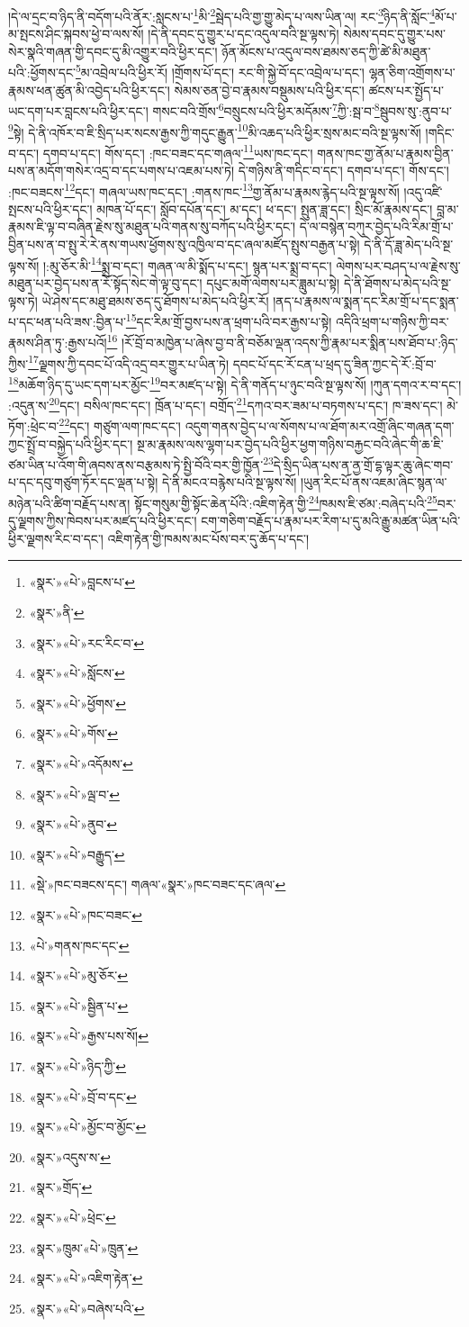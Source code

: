 །དེ་ལ་དྲང་བ་ཉིད་ནི་བདོག་པའི་ནོར་:སླངས་པ་\footnote{«སྣར་»«པེ་»བླངས་པ་}མི་\footnote{«སྣར་»ནི་}སྦེད་པའི་གྱ་གྱུ་མེད་པ་ལས་ཡིན་ལ། རང་\footnote{«སྣར་»«པེ་»རང་རིང་བ་}ཉིད་ནི་སློང་\footnote{«སྣར་»«པེ་»སློངས་}མོ་པ་མ་སྤངས་ཤིང་སྐབས་ཕྱེ་བ་ལས་སོ། །དེ་ནི་དབང་དུ་གྱུར་པ་དང་འདུལ་བའི་སྔ་ལྟས་ཏེ། སེམས་དབང་དུ་གྱུར་པས་སེར་སྣའི་གཞན་གྱི་དབང་དུ་མི་འགྱུར་བའི་ཕྱིར་དང་། ཉོན་མོངས་པ་འདུལ་བས་ཐམས་ཅད་ཀྱི་ཚེ་མི་མཐུན་པའི་:ཕྱོགས་དང་\footnote{«སྣར་»«པེ་»ཕྱོགས་}མ་འབྲེལ་པའི་ཕྱིར་རོ། །གྲོགས་པོ་དང་། རང་གི་སྐྱེ་བོ་དང་འབྲེལ་པ་དང་། ལྷན་ཅིག་འགྲོགས་པ་རྣམས་ཕན་ཚུན་མི་འབྱེད་པའི་ཕྱིར་དང་། སེམས་ཅན་བྱེ་བ་རྣམས་བསྡུམས་པའི་ཕྱིར་དང་། ཚངས་པར་སྤྱོད་པ་ཡང་དག་པར་བླངས་པའི་ཕྱིར་དང་། གསང་བའི་གྲོས་\footnote{«སྣར་»«པེ་»གོས་}བསྲུངས་པའི་ཕྱིར་མདོམས་\footnote{«སྣར་»«པེ་»འདོམས་}ཀྱི་:སྦ་བ་\footnote{«སྣར་»«པེ་»ལྦ་བ་}སྦུབས་སུ་:ནུབ་པ་\footnote{«སྣར་»«པེ་»ནུབ་}སྟེ། དེ་ནི་འཁོར་བ་ཇི་སྲིད་པར་སངས་རྒྱས་ཀྱི་གདུང་རྒྱུན་\footnote{«སྣར་»«པེ་»བརྒྱུད་}མི་འཆད་པའི་ཕྱིར་སྲས་མང་བའི་སྔ་ལྟས་སོ། །གདིང་བ་དང་། དགབ་པ་དང་། གོས་དང་། :ཁང་བཟང་དང་གཞལ་\footnote{«སྡེ་»ཁང་བཟངས་དང་། གཞལ་«སྣར་»ཁང་བཟང་དང་ཞལ་}ཡས་ཁང་དང་། གནས་ཁང་གྱ་ནོམ་པ་རྣམས་བྱིན་པས་ན་མདོག་གསེར་འདྲ་བ་དང་པགས་པ་འཇམ་པས་ཏེ། དེ་གཉིས་ནི་གདིང་བ་དང་། དགབ་པ་དང་། གོས་དང་། :ཁང་བཟངས་\footnote{«སྣར་»«པེ་»ཁང་བཟང་}དང་། གཞལ་ཡས་ཁང་དང་། :གནས་ཁང་\footnote{«པེ་»གནས་ཁང་དང་}གྱ་ནོམ་པ་རྣམས་རྙེད་པའི་སྔ་ལྟས་སོ། །འདུ་འཛི་སྤངས་པའི་ཕྱིར་དང་། མཁན་པོ་དང་། སློབ་དཔོན་དང་། མ་དང་། ཕ་དང་། སྤུན་ཟླ་དང་། སྲིང་མོ་རྣམས་དང་། བླ་མ་རྣམས་ཇི་ལྟ་བ་བཞིན་རྗེས་སུ་མཐུན་པའི་གནས་སུ་བཀོད་པའི་ཕྱིར་དང་། དེ་ལ་བསྙེན་བཀུར་བྱེད་པའི་རིམ་གྲོ་པ་བྱིན་པས་ན་བ་སྤུ་རེ་རེ་ནས་གཡས་ཕྱོགས་སུ་འཁྱིལ་བ་དང་ཞལ་མཛོད་སྤུས་བརྒྱན་པ་སྟེ། དེ་ནི་དོ་ཟླ་མེད་པའི་སྔ་ལྟས་སོ། །:མུ་ཅོར་མི་\footnote{«སྣར་»«པེ་»མུ་ཅོར་}སྨྲ་བ་དང་། གཞན་ལ་མི་སྨོད་པ་དང་། སྙན་པར་སྨྲ་བ་དང་། ལེགས་པར་བཤད་པ་ལ་རྗེས་སུ་མཐུན་པར་བྱེད་པས་ན་རོ་སྟོད་སེང་གེ་ལྟ་བུ་དང་། དཔུང་མགོ་ལེགས་པར་ཟླུམ་པ་སྟེ། དེ་ནི་ཐོགས་པ་མེད་པའི་སྔ་ལྟས་ཏེ། ཡེ་ཤེས་དང་མཐུ་ཐམས་ཅད་དུ་ཐོགས་པ་མེད་པའི་ཕྱིར་རོ། །ནད་པ་རྣམས་ལ་སྨན་དང་རིམ་གྲོ་པ་དང་སྨན་པ་དང་ཕན་པའི་ཟས་:བྱིན་པ་\footnote{«སྣར་»«པེ་»སྦྱིན་པ་}དང་རིམ་གྲོ་བྱས་པས་ན་ཕྲག་པའི་བར་རྒྱས་པ་སྟེ། འདིའི་ཕྲག་པ་གཉིས་ཀྱི་བར་རྣམས་ཤིན་ཏུ་:རྒྱས་པའོ།\footnote{«སྣར་»«པེ་»རྒྱས་པས་སོ།} །རོ་བྲོ་བ་མཁྱེན་པ་ཞེས་བྱ་བ་ནི་བཅོམ་ལྡན་འདས་ཀྱི་རྣམ་པར་སྨིན་པས་ཐོབ་པ་:ཉིད་ཀྱིས་\footnote{«སྣར་»«པེ་»ཉིད་ཀྱི་}ལྗགས་ཀྱི་དབང་པོ་འདི་འདྲ་བར་གྱུར་པ་ཡིན་ཏེ། དབང་པོ་དང་རོ་ངན་པ་ཕྲད་དུ་ཟིན་ཀྱང་དེ་རོ་:བྲོ་བ་\footnote{«སྣར་»«པེ་»བྲོ་བ་དང་}མཆོག་ཉིད་དུ་ཡང་དག་པར་མྱོང་\footnote{«སྣར་»«པེ་»མྱོང་བ་མྱོང་}བར་མཛད་པ་སྟེ། དེ་ནི་གནོད་པ་ཉུང་བའི་སྔ་ལྟས་སོ། །ཀུན་དགའ་ར་བ་དང་། :འདུན་ས་\footnote{«སྣར་»འདུས་ས་}དང་། བསིལ་ཁང་དང་། ཁྲོན་པ་དང་། བགྲོད་\footnote{«སྣར་»གྲོད་}དཀའ་བར་ཟམ་པ་བཏགས་པ་དང་། ཁ་ཟས་དང་། མེ་ཏོག་:ཕྲེང་བ་\footnote{«སྣར་»«པེ་»ཕྲེང་}དང་། གཙུག་ལག་ཁང་དང་། འདུག་གནས་བྱེད་པ་ལ་སོགས་པ་ལ་ཐོག་མར་འགྲོ་ཞིང་གཞན་དག་ཀྱང་སྤྲོ་བ་བསྐྱེད་པའི་ཕྱིར་དང་། སྔ་མ་རྣམས་ལས་ལྷག་པར་བྱེད་པའི་ཕྱིར་ཕྱག་གཉིས་བརྐྱང་བའི་ཞེང་གི་ཆ་ཇི་ཙམ་ཡིན་པ་འོག་གི་ཞབས་ནས་བརྩམས་ཏེ་སྤྱི་བོའི་བར་གྱི་ཁྱོན་\footnote{«སྣར་»ཁྲུམ་«པེ་»ཁྲུན་}དེ་སྲིད་ཡིན་པས་ན་ནྱ་གྲོ་དྷ་ལྟར་ཆུ་ཞེང་གབ་པ་དང་དབུ་གཙུག་ཏོར་དང་ལྡན་པ་སྟེ། དེ་ནི་མངའ་བརྙེས་པའི་སྔ་ལྟས་སོ། །ཡུན་རིང་པོ་ནས་འཇམ་ཞིང་སྙན་ལ་མཉེན་པའི་ཚིག་བརྗོད་པས་ན། སྟོང་གསུམ་གྱི་སྟོང་ཆེན་པོའི་:འཇིག་རྟེན་གྱི་\footnote{«སྣར་»«པེ་»འཇིག་རྟེན་}ཁམས་ཇི་ཙམ་:བཞེད་པའི་\footnote{«སྣར་»«པེ་»བཞེས་པའི་}བར་དུ་ལྗགས་ཀྱིས་ཁེབས་པར་མཛད་པའི་ཕྱིར་དང་། ངག་གཅིག་བརྗོད་པ་རྣམ་པར་རིག་པ་དུ་མའི་རྒྱུ་མཚན་ཡིན་པའི་ཕྱིར་ལྗགས་རིང་བ་དང་། འཇིག་རྟེན་གྱི་ཁམས་མང་པོས་བར་དུ་ཆོད་པ་དང་། 